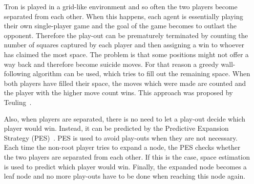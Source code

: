 \documentclass{article}
\begin{document}





Tron is played in a grid-like environment and so often the two players become separated from each other. When this happens, each agent is essentially playing their own single-player game and the goal of the game becomes to outlast the opponent. Therefore the play-out can be prematurely terminated by counting the number of squares captured by each player and then assigning a win to whoever has claimed the most space. The problem is that some positions might not offer a way back and therefore become suicide moves. For that reason a greedy wall-following algorithm can be used, which tries to fill out the remaining space. When both players have filled their space, the moves which were made are counted and the player with the higher move count wins. This approach was proposed by Teuling~\cite{teuling_tron}. %

Also, when players are separated, there is no need to let a play-out decide which player would win. Instead, it can be predicted by the Predictive Expansion Strategy (PES)~\cite{teuling_tron}. PES is used to avoid play-outs when they are not necessary. Each time the non-root player tries to expand a node, the PES checks whether the two players are separated from each other. If this is the case, space estimation is used to predict which player would win. Finally, the expanded node becomes a leaf node and no more play-outs have to be done when reaching this node again. 
\end{document}
